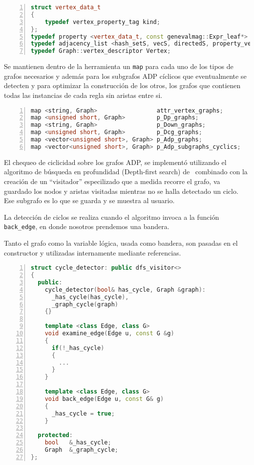 \begin{lstlisting}[language=C++, basicstyle=\scriptsize, numbers=left, numbersep=5pt, numberstyle=\tiny]
struct vertex_data_t
{
    typedef vertex_property_tag kind;
};
typedef property <vertex_data_t, const genevalmag::Expr_leaf*> property_vertex_dp;
typedef adjacency_list <hash_setS, vecS, directedS, property_vertex_dp> Graph;
typedef Graph::vertex_descriptor Vertex;
\end{lstlisting}

Se mantienen dentro de la herramienta un \texttt{map} para cada uno de los tipos de grafos necesarios y además para los subgrafos ADP cíclicos que eventualmente se detecten y para optimizar la construcción de los otros, los grafos que contienen todas las instancias de cada regla sin aristas entre si.

\begin{lstlisting}[language=C++, basicstyle=\scriptsize, numbers=left, numbersep=5pt, numberstyle=\tiny]
map <string, Graph>                 attr_vertex_graphs;
map <unsigned short, Graph>         p_Dp_graphs;
map <string, Graph>                 p_Down_graphs;
map <unsigned short, Graph>         p_Dcg_graphs;
map <vector<unsigned short>, Graph> p_Adp_graphs;
map <vector<unsigned short>, Graph> p_Adp_subgraphs_cyclics;
\end{lstlisting}

El chequeo de ciclicidad sobre los grafos ADP, se implementó utilizando el algoritmo de búsqueda en profundidad (Depth-first search) de \boost\ combinado con la creación de un ``visitador'' especilizado que a medida recorre el grafo, va guardado los nodos y aristas visitadas mientras no se halla detectado un ciclo. Ese subgrafo es lo que se guarda y se muestra al usuario.

La detección de ciclos se realiza cuando el algoritmo invoca a la función \texttt{back\_edge}, en donde nosotros prendemos una bandera.

Tanto el grafo como la variable lógica, usada como bandera, son pasadas en el constructor y utilizadas internamente mediante referencias.

\begin{lstlisting}[language=C++, basicstyle=\scriptsize, numbers=left, numbersep=5pt, numberstyle=\tiny]
struct cycle_detector: public dfs_visitor<>
{
  public:
    cycle_detector(bool& has_cycle, Graph &graph):
      _has_cycle(has_cycle),
      _graph_cycle(graph)
    {}

    template <class Edge, class G>
    void examine_edge(Edge u, const G &g)
    {
      if(!_has_cycle)
      {
        ...
      }
    }

    template <class Edge, class G>
    void back_edge(Edge u, const G& g)
    {
      _has_cycle = true;
    }

  protected:
    bool   &_has_cycle;
    Graph  &_graph_cycle;
};
\end{lstlisting}

